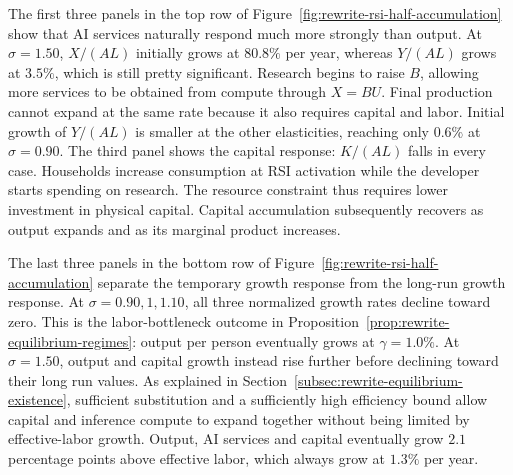 The first three panels in the top row of Figure~\ref{fig:rewrite-rsi-half-accumulation} show that AI services naturally respond much more strongly than output. At $\sigma=1.50$, $X/(AL)$ initially grows at $80.8\%$ per year, whereas $Y/(AL)$ grows at $3.5\%$, which is still pretty significant. Research begins to raise $B$, allowing more services to be obtained from compute through $X=BU$. Final production cannot expand at the same rate because it also requires capital and labor. Initial growth of $Y/(AL)$ is smaller at the other elasticities, reaching only $0.6\%$ at $\sigma=0.90$. The third panel shows the capital response: $K/(AL)$ falls in every case. Households increase consumption at RSI activation while the developer starts spending on research. The resource constraint thus requires lower investment in physical capital. Capital accumulation
subsequently recovers as output expands and as its marginal product increases.

The last three panels in the bottom row of Figure~\ref{fig:rewrite-rsi-half-accumulation} separate the temporary growth response from the long-run growth response. At $\sigma=0.90,1,1.10$, all three normalized growth rates decline
toward zero. This is the labor-bottleneck outcome in
Proposition~\ref{prop:rewrite-equilibrium-regimes}: output per person eventually grows at $\gamma=1.0\%$. At $\sigma=1.50$, output and capital
growth instead rise further before declining toward their long run values.
As explained in Section~\ref{subsec:rewrite-equilibrium-existence},
sufficient substitution and a sufficiently high efficiency bound allow
capital and inference compute to expand together without being limited
by effective-labor growth. Output, AI services and capital eventually grow $2.1$ percentage points above effective labor, which always grow at $1.3\%$ per year.

